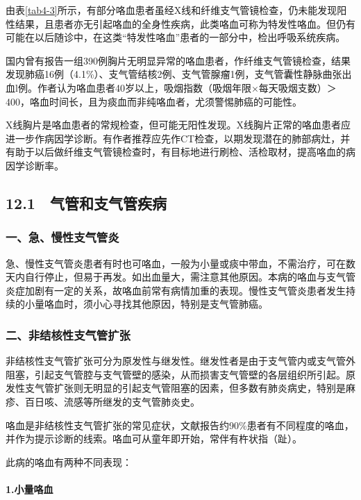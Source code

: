 由表\ref{tab4-3}所示，有部分咯血患者虽经X线和纤维支气管镜检查，仍未能发现阳性结果，且患者亦无引起咯血的全身性疾病，此类咯血可称为特发性咯血。但仍有可能在以后随诊中，在这类“特发性咯血”患者的一部分中，检出呼吸系统疾病。

国内曾有报告一组390例胸片无明显异常的咯血患者，作纤维支气管镜检查，结果发现肺癌16例（4.1\%）、支气管结核2例、支气管腺瘤1例，支气管囊性静脉曲张出血l例。作者认为咯血患者40岁以上，吸烟指数（吸烟年限×每天吸烟支数）＞400，咯血时间长，且为痰血而非纯咯血者，尤须警惕肺癌的可能性。

X线胸片是咯血患者的常规检查，但可能无阳性发现。X线胸片正常的咯血患者应进一步作病因学诊断。有作者推荐应先作CT检查，以期发现潜在的肺部病灶，并有助于以后做纤维支气管镜检查时，有目标地进行刷检、活检取材，提高咯血的病因学诊断率。

\protect\hypertarget{text00057.html}{}{}

\subsection{12.1　气管和支气管疾病}

\subsubsection{一、急、慢性支气管炎}

急、慢性支气管炎患者有时也可咯血，一般为小量或痰中带血，不需治疗，可在数天内自行停止，但易于再发。如出血量大，需注意其他原因。本病的咯血与支气管炎症加剧有一定的关系，故咯血前常有病情加重的表现。慢性支气管炎患者发生持续的小量咯血时，须小心寻找其他原因，特别是支气管肺癌。

\subsubsection{二、非结核性支气管扩张}

非结核性支气管扩张可分为原发性与继发性。继发性者是由于支气管内或支气管外阻塞，引起支气管腔与支气管壁的感染，从而损害支气管壁的各层组织所引起。原发性支气管扩张则无明显的引起支气管阻塞的因素，但多数有肺炎病史，特别是麻疹、百日咳、流感等所继发的支气管肺炎史。

咯血是非结核性支气管扩张的常见症状，文献报告约90\%患者有不同程度的咯血，并作为提示诊断的线索。咯血可从童年即开始，常伴有杵状指（趾）。

此病的咯血有两种不同表现：

\paragraph{1.小量咯血}

